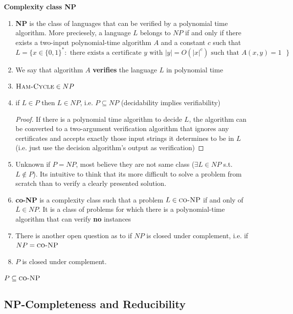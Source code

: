 \documentclass[11pt]{article}
\begin{document}
\begin{defn*}
    \textbf{Complexity class NP}
    \begin{enumerate}
        \item \textbf{NP} is the class of languages that can be verified by a polynomial time algorithm. More preciesely, a language $L$ belongs to $NP$ if and only if there exists a two-input polynomial-time algorithm $A$ and a constant $c$ such that 
        \[
            L = \{x\in \{ 0,1\}^* : \text{ there exists a certificate $y$ with $|y| = O(|x|^c)$ such that $A(x,y) = 1$ } \}
        \]
        \item We say that algorithm $A$ \textbf{verifies} the language $L$ in polynomial time
        \item $\textsc{Ham-Cycle} \in NP$
        \item if $L\in P$ then $L\in NP$, i.e. $P\subseteq NP$ (decidability implies verifiability)
        \begin{proof}
            If there is a polynomial time algorithm to decide $L$, the algorithm can be converted to a two-argument verification algorithm that ignores any certificates and accepts exactly those input strings it determines to be in $L$ (i.e. just use the decision algorithm's output as verification)
        \end{proof}
        \item Unknown if $P = NP$, most believe they are not same class ($\exists L \in NP$ s.t. $L\not\in P$). Its intuitive to think that its more difficult to solve a problem from scratch than to verify a clearly presented solution.
        \item \textbf{co-NP} is a complexity class such that a problem $L \in \textsc{co-NP}$ if and only of $\overline{L} \in NP$. It is a class of problems for which there is a polynomial-time algorithm that can verify \textbf{no} instances 
        \item There is another open question as to if $NP$ is closed under complement, i.e. if $NP = \textsc{co-NP}$
        \item $P$ is closed under complement.
    \end{enumerate}
\end{defn*}


\begin{theorem*}
    $P\subseteq \textsc{co-NP}$
\end{theorem*}

\subsection*{NP-Completeness and Reducibility}
\end{document}
